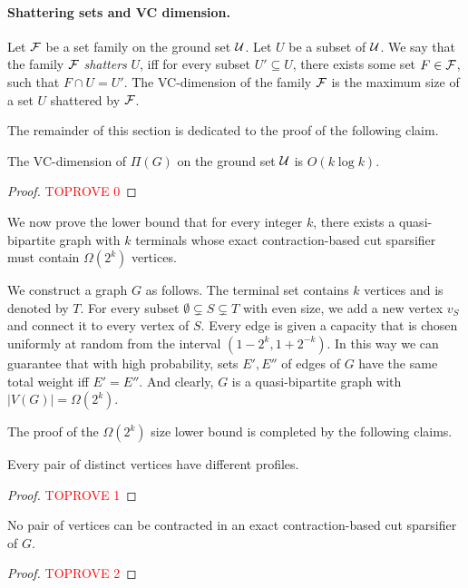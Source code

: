 \paragraph{Shattering sets and VC dimension.} Let ${\mathcal{F}}$ be a set family on the ground set ${\mathcal U}$.
Let $U$ be a subset of ${\mathcal U}$. We say that the family ${\mathcal{F}}$ \emph{shatters} $U$, iff for every subset $U'\subseteq U$, there exists some set $F\in {\mathcal{F}}$, such that $F\cap U=U'$. The VC-dimension of the family ${\mathcal{F}}$ is the maximum size of a set $U$ shattered by ${\mathcal{F}}$.

The remainder of this section is dedicated to the proof of the following claim.

\begin{claim}
\label{clm: VC-dim}
The VC-dimension of $\Pi(G)$ on the ground set ${\mathcal U}$ is $O(k \log k)$.
\end{claim}
\begin{proof}\textcolor{red}{TOPROVE 0}\end{proof}


We now prove the lower bound that for every integer $k$, there exists a quasi-bipartite graph with $k$ terminals whose exact contraction-based cut sparsifier must contain $\Omega(2^k)$ vertices.


We construct a graph $G$ as follows. The terminal set contains $k$ vertices and is denoted by $T$. For every subset $\emptyset\subsetneq S \subsetneq T$ with even size, we add a new vertex $v_S$ and connect it to every vertex of $S$.
Every edge is given a capacity that is chosen uniformly at random from the interval $(1-2^{k},1+2^{-k})$. In this way we can guarantee that with high probability, sets $E',E''$ of edges of $G$ have the same total weight iff $E'=E''$.
And clearly, $G$ is a quasi-bipartite graph with $|V(G)|=\Omega(2^k)$.

The proof of the $\Omega(2^k)$ size lower bound is completed by the following claims.

\begin{claim}
\label{clm: profiles}
Every pair of distinct vertices have different profiles.
\end{claim}
\begin{proof}\textcolor{red}{TOPROVE 1}\end{proof}



\begin{claim}
No pair of vertices can be contracted in an exact contraction-based cut sparsifier of $G$.
\end{claim}
\begin{proof}\textcolor{red}{TOPROVE 2}\end{proof}









